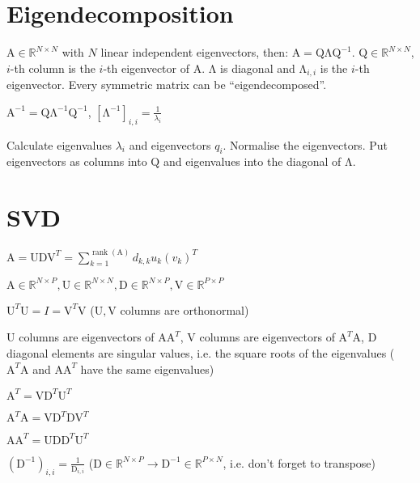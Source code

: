 \documentclass[a4paper, 11pt, landscape]{article}
\newcommand{\matr}[1]{\boldsymbol{\mathrm{#1}}}
\begin{document}
\begin{multicols*}{3}
\section{Eigendecomposition}
$\matr{A} \in \mathbb{R}^{N \times N}$ with $N$ linear independent eigenvectors, then: $\matr{A} = \matr{Q \Lambda Q}^{-1}$. $\matr{Q} \in \mathbb{R}^{N \times N}$, $i$-th column is the $i$-th eigenvector of $\matr{A}$. $\matr{\Lambda}$ is diagonal and $\matr{\Lambda}_{i,i}$ is the $i$-th eigenvector. Every symmetric matrix can be ``eigendecomposed''.

$\matr{A}^{-1} = \matr{Q} \matr{\Lambda}^{-1} \matr{Q}^{-1}$, $\left[ \matr{\Lambda}^{-1} \right]_{i,i} = \frac{1}{\lambda_i}$

Calculate eigenvalues $\lambda_i$ and eigenvectors $q_i$. Normalise the eigenvectors. Put eigenvectors as columns into $\matr{Q}$ and eigenvalues into the diagonal of $\matr{\Lambda}$.

\section{SVD}
\begin{compactitem}
	\item $\matr{A} = \matr{U} \matr{D} \matr{V}^T = \sum_{k=1}^{\operatorname{rank}(\matr{A})} d_{k,k} u_k (v_k)^T$
	\item $\matr{A} \in \mathbb{R}^{N \times P}, \matr{U} \in \mathbb{R}^{N \times N}, \matr{D} \in \mathbb{R}^{N \times P}, \matr{V} \in \mathbb{R}^{P \times P}$
	\item $\matr{U}^T \matr{U} = I = \matr{V}^T \matr{V}$ ($\matr{U}, \matr{V}$ columns are orthonormal)
	\item $\matr{U}$ columns are eigenvectors of $\matr{A} \matr{A}^T$, $\matr{V}$ columns are eigenvectors of $\matr{A}^T \matr{A}$, $\matr{D}$ diagonal elements are singular values, i.e. the square roots of the eigenvalues ($\matr{A}^T \matr{A}$ and $\matr{A} \matr{A}^T$ have the same eigenvalues)
	{\setlength{\multicolsep}{0pt}
		\begin{multicols*}{2}
			\item $\matr{A}^T = \matr{V} \matr{D}^T \matr{U}^T$
			\item $\matr{A}^T \matr{A} = \matr{V} \matr{D}^T \matr{D} \matr{V}^T$
			\item $\matr{A} \matr{A}^T = \matr{U} \matr{D} \matr{D}^T \matr{U}^T$
		\end{multicols*}
	}
	\item $(\matr{D}^{-1})_{i,i} = \frac{1}{\matr{D}_{i, i}}$ ($\matr{D} \in \mathbb{R}^{N \times P} \to \matr{D}^{-1} \in \mathbb{R}^{P \times N}$, i.e. don't forget to transpose)
\end{compactitem}


\end{multicols*}
\end{document}
